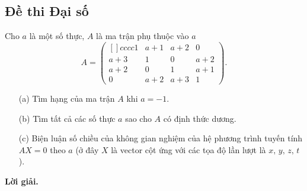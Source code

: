 \newpage
\subsection{Đề thi Đại số}
\begin{tcolorbox}[title=\textbf{Bài toán B.1 + A.1.}]
    Cho $a$ là một số thực, $A$ là ma trận phụ thuộc vào $a$
    $$A = \begin{pmatrix}[]{cccc}
        1 & a+1 & a+2 & 0 \\
        a+3 & 1 & 0 & a+2 \\
        a+2 & 0 & 1 & a+1 \\
        0 & a+2 & a+3 & 1 
    \end{pmatrix}.$$

    \begin{enumerate}
        \item[(a)] Tìm hạng của ma trận $A$ khi $a = -1$.
        \item[(b)] Tìm tất cả các số thực $a$ sao cho $A$ có định thức dương.
        \item[(c)] Biện luận số chiều của không gian nghiệm của hệ phương trình tuyến tính $AX = 0$ theo $a$ (ở đây $X$ là vector cột ứng với các tọa độ lần lượt là $x,\,y,\,z,\,t$). 
    \end{enumerate}
\end{tcolorbox}

\textbf{Lời giải.}

